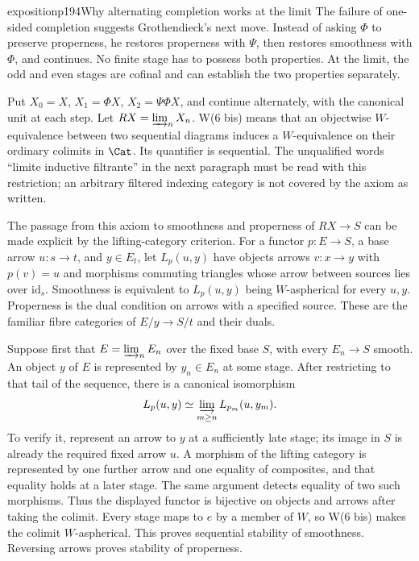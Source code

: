 \begin{dcomment}{exposition}{p194}{Why alternating completion works at the limit}
The failure of one-sided completion suggests Grothendieck's next move. Instead of asking $\Phi$ to preserve properness, he restores properness with $\Psi$, then restores smoothness with $\Phi$, and continues. No finite stage has to possess both properties. At the limit, the odd and even stages are cofinal and can establish the two properties separately.

Put $X_0=X$, $X_1=\Phi X$, $X_2=\Psi\Phi X$, and continue alternately, with the canonical unit at each step. Let $R X=\varinjlim_n X_n$. W(6 bis) means that an objectwise $W$-equivalence between two sequential diagrams induces a $W$-equivalence on their ordinary colimits in $\Cat$. Its quantifier is sequential. The unqualified words ``limite inductive filtrante'' in the next paragraph must be read with this restriction; an arbitrary filtered indexing category is not covered by the axiom as written.

The passage from this axiom to smoothness and properness of $RX\to S$ can be made explicit by the lifting-category criterion. For a functor $p:E\to S$, a base arrow $u:s\to t$, and $y\in E_t$, let $L_p(u,y)$ have objects arrows $v:x\to y$ with $p(v)=u$ and morphisms commuting triangles whose arrow between sources lies over $\mathrm{id}_s$. Smoothness is equivalent to $L_p(u,y)$ being $W$-aspherical for every $u,y$. Properness is the dual condition on arrows with a specified source. These are the familiar fibre categories of $E/y\to S/t$ and their duals.

Suppose first that $E=\varinjlim_n E_n$ over the fixed base $S$, with every $E_n\to S$ smooth. An object $y$ of $E$ is represented by $y_n\in E_n$ at some stage. After restricting to that tail of the sequence, there is a canonical isomorphism
\[
 L_p(u,y)\simeq\varinjlim_{m\ge n}L_{p_m}(u,y_m).
\]
To verify it, represent an arrow to $y$ at a sufficiently late stage; its image in $S$ is already the required fixed arrow $u$. A morphism of the lifting category is represented by one further arrow and one equality of composites, and that equality holds at a later stage. The same argument detects equality of two such morphisms. Thus the displayed functor is bijective on objects and arrows after taking the colimit. Every stage maps to $e$ by a member of $W$, so W(6 bis) makes the colimit $W$-aspherical. This proves sequential stability of smoothness. Reversing arrows proves stability of properness.


\end{dcomment}
